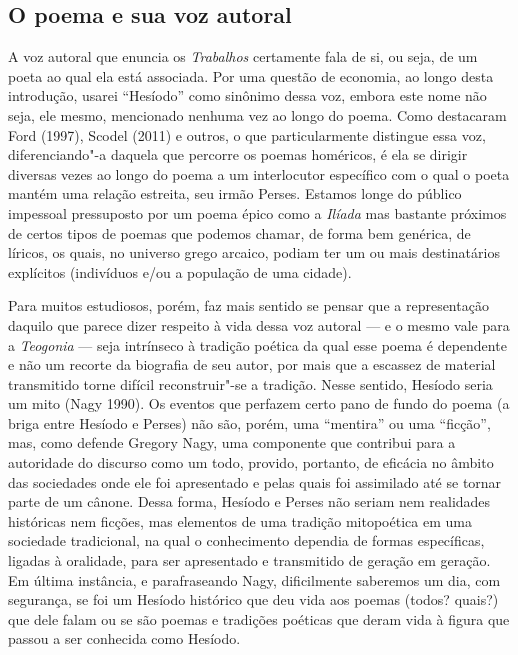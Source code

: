 \subsection{O poema e sua voz autoral}


A voz autoral que enuncia os \emph{Trabalhos} certamente fala de si, ou
seja, de um poeta ao qual ela está associada. Por uma questão de
economia, ao longo desta introdução, usarei ``Hesíodo'' como sinônimo
dessa voz, embora este nome não seja, ele mesmo, mencionado nenhuma vez
ao longo do poema. Como destacaram Ford (1997), Scodel (2011) e outros,
o que particularmente distingue essa voz, diferenciando"-a daquela que
percorre os poemas homéricos, é ela se dirigir diversas vezes ao longo
do poema a um interlocutor específico com o qual o poeta mantém uma
relação estreita, seu irmão Perses. Estamos longe do público impessoal
pressuposto por um poema épico como a \emph{Ilíada} mas bastante
próximos de certos tipos de poemas que podemos chamar, de forma bem
genérica, de líricos, os quais, no universo grego arcaico, podiam ter um
ou mais destinatários explícitos (indivíduos e/ou a população de uma
cidade).

Para muitos estudiosos, porém, faz mais sentido se pensar que a
representação daquilo que parece dizer respeito à vida dessa voz autoral
--- e o mesmo vale para a \emph{Teogonia} --- seja intrínseco à tradição
poética da qual esse poema é dependente e não um recorte da biografia de
seu autor, por mais que a escassez de material transmitido torne difícil
reconstruir"-se a tradição. Nesse sentido, Hesíodo seria um mito (Nagy
1990). Os eventos que perfazem certo pano de fundo do poema (a briga
entre Hesíodo e Perses) não são, porém, uma ``mentira'' ou uma
``ficção'', mas, como defende Gregory Nagy, uma componente que contribui
para a autoridade do discurso como um todo, provido, portanto, de
eficácia no âmbito das sociedades onde ele foi apresentado e pelas quais
foi assimilado até se tornar parte de um cânone. Dessa forma, Hesíodo e
Perses não seriam nem realidades históricas nem ficções, mas elementos
de uma tradição mitopoética em uma sociedade tradicional, na qual o
conhecimento dependia de formas específicas, ligadas à oralidade, para
ser apresentado e transmitido de geração em geração. Em última
instância, e parafraseando Nagy, dificilmente saberemos um dia, com
segurança, se foi um Hesíodo histórico que deu vida aos poemas (todos?
quais?) que dele falam ou se são poemas e tradições poéticas que deram
vida à figura que passou a ser conhecida como Hesíodo.

